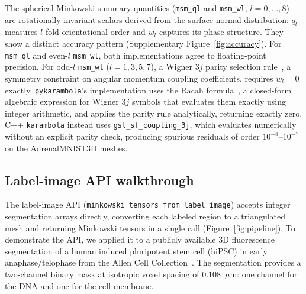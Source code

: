 \documentclass[times, twoside, watermark]{zHenriquesLab-StyleBioRxiv}
\begin{document}
The spherical Minkowski summary quantities (\texttt{msm\_ql} and
\texttt{msm\_wl}, $l = 0, \ldots, 8$) are rotationally invariant scalars derived
from the surface normal distribution: $q_l$ measures $l$-fold orientational order
and $w_l$ captures its phase structure.
They show a distinct accuracy pattern (Supplementary Figure~\ref{fig:accuracy}).
For \texttt{msm\_ql} and even-$l$ \texttt{msm\_wl}, both implementations agree
to floating-point precision.
For odd-$l$ \texttt{msm\_wl} ($l = 1, 3, 5, 7$), a Wigner $3j$ parity selection
rule~\cite{Steinhardt1983, Varshalovich1988}, a symmetry constraint on angular
momentum coupling coefficients, requires $w_l = 0$ exactly.
\texttt{pykarambola}'s implementation uses the Racah formula~\cite{Varshalovich1988},
a closed-form algebraic expression for Wigner $3j$ symbols that evaluates
them exactly using integer arithmetic, and applies the parity rule
analytically, returning exactly zero.
C++ \texttt{karambola} instead uses \texttt{gsl\_sf\_coupling\_3j}, which
evaluates numerically without an explicit parity check, producing spurious
residuals of order $10^{-8}$--$10^{-7}$ on the AdrenalMNIST3D meshes.

\subsection*{Label-image API walkthrough}
The label-image API (\texttt{minkowski\_tensors\_from\_label\_image}) accepts integer segmentation arrays directly, converting each labeled region to a triangulated mesh and returning Minkowski tensors in a single call (Figure~\ref{fig:pipeline}).
To demonstrate the API, we applied it to a publicly available 3D fluorescence segmentation of a human induced pluripotent stem cell (hiPSC) in early anaphase/telophase from the Allen Cell Collection~\cite{viana2023integrated}.
The segmentation provides a two-channel binary mask at isotropic voxel spacing of 0.108~$\mu$m: one channel for the DNA and one for the cell membrane.
\end{document}
